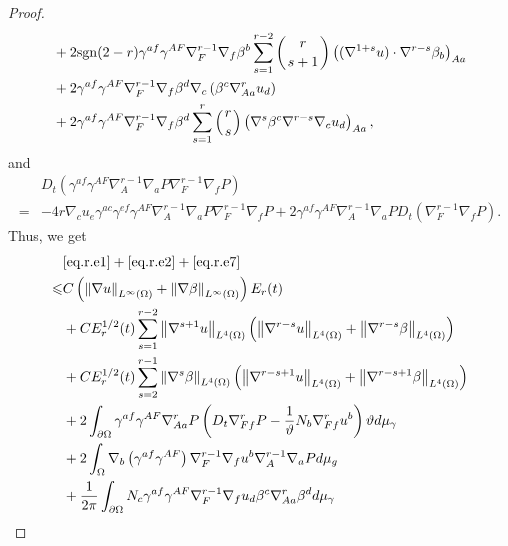 \documentclass[12pt,reqno]{amsart}
\numberwithin{equation}{section}
\theoremstyle{definition}
\theoremstyle{remark}
\begin{document}
\begin{proof}
\begin{align*}
  &+2{\mathrm{sgn}}(2-r)\gamma^{af}\gamma^{AF}{\nabla}_F^{r-1}{\nabla}_f \beta^b\sum_{s=1}^{r-2}\left(r\atop s+1\right)\left(({\nabla}^{1+s}u)\cdot {\nabla}^{r-s}\beta_b\right)_{Aa}\\
  &+2\gamma^{af}\gamma^{AF}{\nabla}_F^{r-1}{\nabla}_f \beta^d{\nabla}_c\left(\beta^c{\nabla}_{Aa}^r u_d\right)\\
  &+2\gamma^{af}\gamma^{AF}{\nabla}_F^{r-1}{\nabla}_f \beta^d\sum_{s=1}^{r}\left(r\atop s\right)\left( {\nabla}^s\beta^c{\nabla}^{r-s} {\nabla}_c u_d\right)_{Aa},
\end{align*}
and
\begin{align*}
  &D_t\left(\gamma^{af}\gamma^{AF}{\nabla}_A^{r-1}{\nabla}_a {P }{\nabla}_F^{r-1}{\nabla}_f {P }\right)\\
  =&-4r{\nabla}_c u_e\gamma^{ac}\gamma^{ef}\gamma^{AF}{\nabla}_A^{r-1}{\nabla}_a {P }{\nabla}_F^{r-1}{\nabla}_f {P }+2 \gamma^{af}\gamma^{AF}{\nabla}_A^{r-1}{\nabla}_a {P } D_t\left({\nabla}_F^{r-1}{\nabla}_f {P }\right).
\end{align*}
Thus, we get
\begin{align}
  &\eqref{eq.r.e1}+\eqref{eq.r.e2}+\eqref{eq.r.e7}{\nonumber}\\
  {\leqslant}& C\left({\left\Vert{{\nabla} u}\right\Vert}_{L^\infty(\Omega)}+{\left\Vert{{\nabla} \beta}\right\Vert}_{L^\infty(\Omega)}\right) E_r(t){\nonumber}\\
  &+C E_r^{1/2}(t)\sum_{s=1}^{r-2}{\left\Vert{{\nabla}^{s+1} u}\right\Vert}_{L^4(\Omega)}\left({\left\Vert{{\nabla}^{r-s} u}\right\Vert}_{L^4(\Omega)}+{\left\Vert{{\nabla}^{r-s} \beta}\right\Vert}_{L^4(\Omega)}\right)\label{eq.r.e111}\\
  &+C E_r^{1/2}(t)\sum_{s=2}^{r-1}{\left\Vert{{\nabla}^s \beta}\right\Vert}_{L^4(\Omega)}\left({\left\Vert{{\nabla}^{r-s+1}u}\right\Vert}_{L^4(\Omega)}+{\left\Vert{{\nabla}^{r-s+1} \beta}\right\Vert}_{L^4(\Omega)}\right)\label{eq.r.e112}\\
  &+2\int_{{\partial}\Omega}\gamma^{af}\gamma^{AF}{\nabla}_{Aa}^{r}{P } \left(D_t{\nabla}_{Ff}^{r} {P }-\frac{1}{\vartheta}N_b{\nabla}_{Ff}^{r} u^b\right) \vartheta d\mu_\gamma \label{eq.r.e11}\\
  &+2\int_{\Omega}{\nabla}_b\left(\gamma^{af}\gamma^{AF}\right){\nabla}_F^{r-1}{\nabla}_f u^b{\nabla}_A^{r-1}{\nabla}_a{P } d\mu_g\label{eq.r.e12}\\
  &+\frac{1}{2\pi}\int_{{\partial}\Omega} N_c\gamma^{af}\gamma^{AF}{\nabla}_F^{r-1}{\nabla}_f u_d\beta^c{\nabla}_{Aa}^r\beta^d d\mu_\gamma\label{eq.r.e13}\\

\end{align}
\end{proof}
\end{document}
